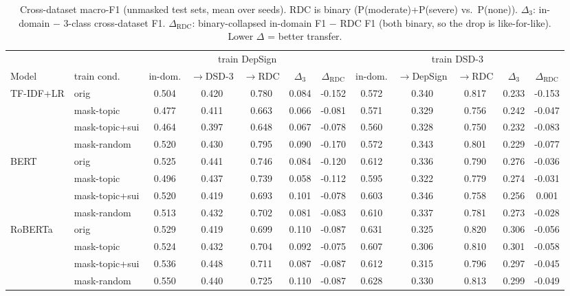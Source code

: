 \begin{table}[t]
\centering
\caption{Cross-dataset macro-F1 (unmasked test sets, mean over seeds). RDC is binary (P(moderate)+P(severe) vs.\ P(none)). $\Delta_3$: in-domain $-$ 3-class cross-dataset F1. $\Delta_{\mathrm{RDC}}$: binary-collapsed in-domain F1 $-$ RDC F1 (both binary, so the drop is like-for-like). Lower $\Delta$ = better transfer.}
\label{tab:cross}
\scriptsize
\setlength{\tabcolsep}{3pt}
\begin{tabular}{llcccccccccc}
\toprule
 & & \multicolumn{5}{c}{train DepSign} & \multicolumn{5}{c}{train DSD-3} \\
\cmidrule(lr){3-7}\cmidrule(lr){8-12}
Model & train cond. & in-dom. & $\to$DSD-3 & $\to$RDC & $\Delta_3$ & $\Delta_{\mathrm{RDC}}$ & in-dom. & $\to$DepSign & $\to$RDC & $\Delta_3$ & $\Delta_{\mathrm{RDC}}$ \\
\midrule
TF-IDF+LR & orig & 0.504 & 0.420 & 0.780 & 0.084 & -0.152 & 0.572 & 0.340 & 0.817 & 0.233 & -0.153 \\
 & mask-topic & 0.477 & 0.411 & 0.663 & 0.066 & -0.081 & 0.571 & 0.329 & 0.756 & 0.242 & -0.047 \\
 & mask-topic+sui & 0.464 & 0.397 & 0.648 & 0.067 & -0.078 & 0.560 & 0.328 & 0.750 & 0.232 & -0.083 \\
 & mask-random & 0.520 & 0.430 & 0.795 & 0.090 & -0.170 & 0.572 & 0.343 & 0.801 & 0.229 & -0.077 \\
\addlinespace[2pt]
BERT & orig & 0.525 & 0.441 & 0.746 & 0.084 & -0.120 & 0.612 & 0.336 & 0.790 & 0.276 & -0.036 \\
 & mask-topic & 0.496 & 0.437 & 0.739 & 0.058 & -0.112 & 0.595 & 0.322 & 0.779 & 0.274 & -0.031 \\
 & mask-topic+sui & 0.520 & 0.419 & 0.693 & 0.101 & -0.078 & 0.603 & 0.346 & 0.758 & 0.256 & 0.001 \\
 & mask-random & 0.513 & 0.432 & 0.702 & 0.081 & -0.083 & 0.610 & 0.337 & 0.781 & 0.273 & -0.028 \\
\addlinespace[2pt]
RoBERTa & orig & 0.529 & 0.419 & 0.699 & 0.110 & -0.087 & 0.631 & 0.325 & 0.820 & 0.306 & -0.056 \\
 & mask-topic & 0.524 & 0.432 & 0.704 & 0.092 & -0.075 & 0.607 & 0.306 & 0.810 & 0.301 & -0.058 \\
 & mask-topic+sui & 0.536 & 0.448 & 0.711 & 0.087 & -0.087 & 0.612 & 0.315 & 0.796 & 0.297 & -0.045 \\
 & mask-random & 0.550 & 0.440 & 0.725 & 0.110 & -0.087 & 0.628 & 0.330 & 0.813 & 0.299 & -0.049 \\

\end{tabular}
\end{table}

